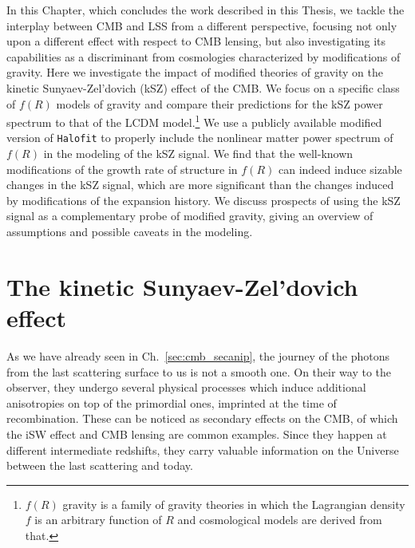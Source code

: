 In this Chapter, which concludes the work described in this Thesis, we tackle the interplay between CMB and LSS from a different perspective, focusing not only upon a different effect with respect to CMB lensing, but also investigating its capabilities as a discriminant from cosmologies characterized by modifications of gravity. Here we investigate the impact of modified theories of gravity on the kinetic Sunyaev-Zel'dovich (kSZ) effect of the \gls{CMB}. We focus on a  specific class of $f(R)$ models of gravity and compare their predictions for the kSZ power spectrum to that of the \gls{LCDM} model.\footnote{$f(R)$ gravity is a family of gravity theories in which the Lagrangian density $f$ is an arbitrary function of $R$ and cosmological models are derived from that.} We use a publicly available modified version of \texttt{Halofit} to properly include the nonlinear matter power spectrum of $f(R)$  in the modeling of the kSZ signal. We find that the well-known modifications of the growth rate of structure in $f(R)$ can indeed induce sizable  changes in the kSZ signal, which are more significant than the changes induced by modifications of the expansion history. We discuss prospects of using the kSZ signal as a complementary probe of modified gravity, giving an overview of assumptions and possible caveats in the modeling. 

\section{The kinetic Sunyaev-Zel'dovich effect}\label{Sec:Intro}
As we have already seen in Ch.~\eqref{sec:cmb_secanip}, the journey of the photons from the last scattering surface to us is not a smooth one. On their way to the observer, they undergo several physical processes which induce additional anisotropies on top of the primordial ones, imprinted at the time of recombination.  These can be noticed as  secondary effects on the \gls{CMB}, of which the \gls{iSW} effect and CMB lensing are common examples.  Since they happen at different intermediate redshifts, they carry valuable information on the Universe between the last scattering and today. 

